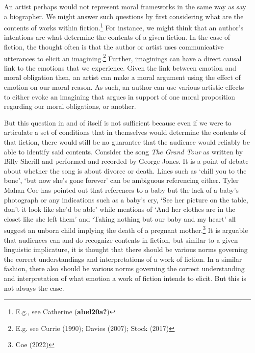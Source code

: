 \documentclass[12pt]{book}
\theoremstyle{definition}
\theoremstyle{remark}
\begin{document}
An artist perhaps would not represent moral frameworks in the same way as say a biographer. We might answer such questions by first considering what are the contents of works within fiction.\footnote{E.g., see Catherine (\textbf{abel20a?})} For instance, we might think that an author's intentions are what determine the contents of a given fiction. In the case of fiction, the thought often is that the author or artist uses communicative utterances to elicit an imagining.\footnote{E.g. see Currie (1990); Davies (2007); Stock (2017)} Further, imaginings can have a direct causal link to the emotions that we experience. Given the link between emotion and moral obligation then, an artist can make a moral argument using the effect of emotion on our moral reason. As such, an author can use various artistic effects to either evoke an imagining that argues in support of one moral proposition regarding our moral obligations, or another.

But this question in and of itself is not sufficient because even if we were to articulate a set of conditions that in themselves would determine the contents of that fiction, there would still be no guarantee that the audience would reliably be able to identify said contents. Consider the song \emph{The Grand Tour} as written by Billy Sherill and performed and recorded by George Jones. It is a point of debate about whether the song is about divorce or death. Lines such as `chill you to the bone', `but now she's gone forever' can be ambiguous referencing either. Tyler Mahan Coe has pointed out that references to a baby but the lack of a baby's photograph or any indications such as a baby's cry, `See her picture on the table, don't it look like she'd be able' while mentions of `And her clothes are in the closet like she left them' and `Taking nothing but our baby and my heart' all suggest an unborn child implying the death of a pregnant mother.\footnote{Coe (2022)} It is arguable that audiences can and do recognize contents in fiction, but similar to a given linguistic implicature, it is thought that there should be various norms governing the correct understandings and interpretations of a work of fiction. In a similar fashion, there also should be various norms governing the correct understanding and interpretation of what emotion a work of fiction intends to elicit. But this is not always the case.
\end{document}
